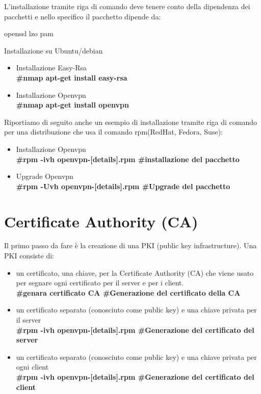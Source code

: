 L'installazione tramite riga di comando deve tenere conto della dipendenza dei pacchetti e nello specifico il pacchetto dipende da:

\textasteriskcentered openssl
\textasteriskcentered lzo
\textasteriskcentered pam

Installazione su Ubuntu/debian

\begin{itemize}
    \item Installazione Easy-Rsa \\
      \textbf{ \#nmap  apt-get install easy-rsa}
   \item Installazione Openvpn \\
      \textbf{ \#nmap  apt-get install openvpn}
\end{itemize}


Riportiamo di seguito anche un esempio di installazione tramite riga di comando per una distribuzione che usa il comando rpm(RedHat, Fedora, Suse):

\begin{itemize}
    \item Installazione Openvpn \\
      \textbf{ \#rpm -ivh openvpn-[details].rpm \#installazione del pacchetto}
   \item Upgrade Openvpn \\
      \textbf{ \#rpm -Uvh openvpn-[details].rpm  \#Upgrade del pacchetto}
\end{itemize}

\section{Certificate Authority (CA)}

Il primo passo da fare è la creazione di una PKI (public key infrastructure).
 Una PKI consiste di:
\begin{itemize}
    
   \item  un certificato, una chiave,  per la Certificate Authority (CA) che viene usato per segnare ogni certificato per il server e per i client. \\
      \textbf{ \#genara certificato CA  \#Generazione del certificato della CA}
    \item  un certificato separato (conosciuto come public key) e una chiave privata per il server \\
      \textbf{ \#rpm -ivh openvpn-[details].rpm \#Generazione del certificato del server}
      
    \item  un certificato separato (conosciuto come public key) e una chiave privata per ogni client \\
      \textbf{ \#rpm -ivh openvpn-[details].rpm \#Generazione del certificato del client} 
\end{itemize}

